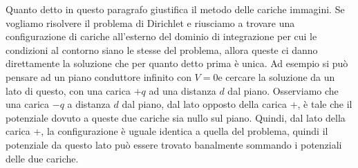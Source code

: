 Quanto detto in questo paragrafo giustifica il metodo delle cariche immagini. Se vogliamo risolvere il problema di Dirichlet e riusciamo a trovare una configurazione di cariche all'esterno del dominio di integrazione per cui le condizioni al contorno siano le stesse del problema, allora queste ci danno direttamente la soluzione che per quanto detto prima è unica. Ad esempio si può pensare ad un piano conduttore infinito con $V=0$e cercare la soluzione da un lato di questo, con una carica $+q$ ad una distanza $d$ dal piano. Osserviamo che una carica $-q$ a distanza $d$ dal piano, dal lato opposto della carica +, è tale che il potenziale dovuto a queste due cariche sia nullo sul piano. Quindi, dal lato della carica +, la configurazione è uguale identica a quella del problema, quindi il potenziale da questo lato può essere trovato banalmente sommando i potenziali delle due cariche.



